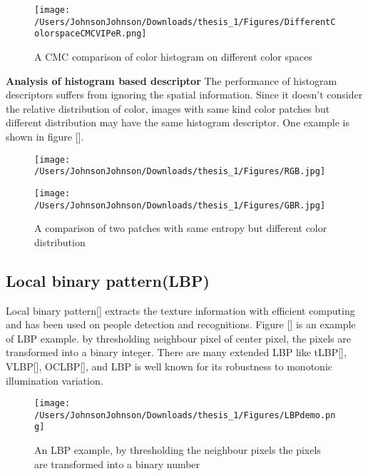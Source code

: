 \begin{figure}
\centering

\texttt{[image: /Users/JohnsonJohnson/Downloads/thesis\_1/Figures/DifferentColorspaceCMCVIPeR.png]}
\caption{A CMC comparison of color histogram on different color spaces }
\vspace{0em}
\end{figure} 

\textbf{Analysis of histogram based descriptor} The performance of histogram descriptors suffers from ignoring the spatial information. Since it doesn't consider the relative distribution of color, images with same kind color patches but different distribution may have the same histogram descriptor. One example is shown in figure [].

\begin{figure}[H]
\begin{minipage}[t]{0.5\linewidth}
\centering
\texttt{[image: /Users/JohnsonJohnson/Downloads/thesis\_1/Figures/RGB.jpg]}
\label{fig:side:a}
\end{minipage}%
\begin{minipage}[t]{0.5\linewidth}
\centering
\texttt{[image: /Users/JohnsonJohnson/Downloads/thesis\_1/Figures/GBR.jpg]}
\label{fig:side:b}
\end{minipage}
\caption{A comparison of two patches with same entropy but different color distribution}
\end{figure}

\subsection{Local binary pattern(LBP)}
Local binary pattern[] extracts the texture information with efficient computing and has been used on people detection and recognitions. Figure [] is an example of LBP example. by thresholding neighbour pixel of center pixel, the pixels are transformed into a binary integer. There are many extended LBP like tLBP[], VLBP[], OCLBP[], and LBP is well known for its robustness to monotonic illumination variation.
\begin{figure}[H]
\centering
\texttt{[image: /Users/JohnsonJohnson/Downloads/thesis\_1/Figures/LBPdemo.png]}
\caption{An LBP example, by thresholding the neighbour pixels the pixels are transformed into a binary number }
\vspace{0em}
\end{figure}


